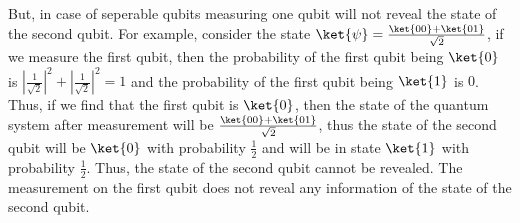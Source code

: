 \documentclass[12pt, oneside]{book}
\theoremstyle{definition}
\theoremstyle{definition}
\theoremstyle{remark}
\begin{document}
But, in case of seperable qubits measuring one qubit will not reveal the state of the second qubit. For example, consider the state $\ket{\psi}=\frac{\ket{00}+\ket{01}}{\sqrt{2}}$,
if we measure the first qubit, then the probability of the first qubit being $\ket{0}$ is $|\frac{1}{\sqrt{2}}|^2+|\frac{1}{\sqrt{2}}|^2=1$ and the probability of the first qubit being $\ket{1}$ is $0$.
Thus, if we find that the first qubit is $\ket{0}$, then the state of the quantum system after measurement will be $\frac{\ket{00}+\ket{01}}{\sqrt{2}}$, thus the state of the second qubit will be $\ket{0}$ with probability $\frac{1}{2}$ and 
will be in state $\ket{1}$ with probability $\frac{1}{2}$. Thus, the state of the second qubit cannot be revealed. The measurement on the first qubit does not reveal any information of the state of the second qubit. 
\end{document}
